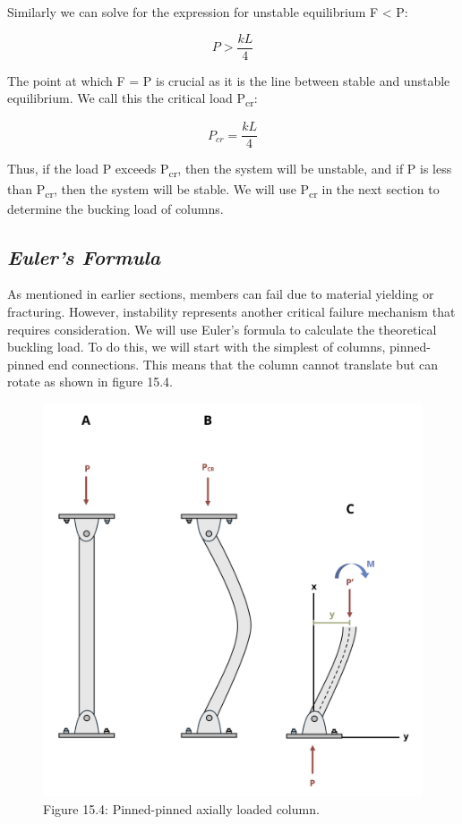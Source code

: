 \documentclass[
  letterpaper,
  DIV=11,
  numbers=noendperiod]{scrreprt}
\begin{document}
Similarly we can solve for the expression for unstable equilibrium F
\textless{} P:

\[
P>\frac{k L}{4}
\]

The point at which F = P is crucial as it is the line between stable and
unstable equilibrium. We call this the critical load
P\textsubscript{cr}:

\[
P_{c r}=\frac{k L}{4}
\]

Thus, if the load P exceeds P\textsubscript{cr}, then the system will be
unstable, and if P is less than P\textsubscript{cr}, then the system
will be stable. We will use P\textsubscript{cr} in the next section to
determine the bucking load of columns.

\subsection{\texorpdfstring{\emph{Euler's
Formula}}{Euler's Formula}}\label{eulers-formula}

As mentioned in earlier sections, members can fail due to material
yielding or fracturing. However, instability represents another critical
failure mechanism that requires consideration. We will use Euler's
formula to calculate the theoretical buckling load. To do this, we will
start with the simplest of columns, pinned-pinned end connections. This
means that the column cannot translate but can rotate as shown in figure
15.4.

\begin{figure}[H]

{\centering \includegraphics{images/CH15s PNGs/figure 15.4.png}

}

\caption{Figure 15.4: Pinned-pinned axially loaded column.}

\end{figure}%
\end{document}
